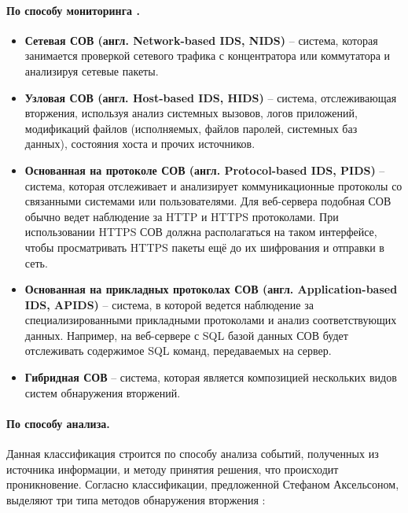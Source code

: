 \paragraph*{По способу мониторинга \cite{kasperskyIDS}.}

\begin{itemize}
	\item \textbf{Сетевая СОВ (англ. Network-based IDS, NIDS)} -- система,
	которая занимается проверкой сетевого трафика с концентратора или коммутатора и
	анализируя сетевые пакеты.

	\item \textbf{Узловая СОВ (англ. Host-based IDS, HIDS)} -- система,
	отслеживающая вторжения, используя анализ системных вызовов, логов приложений,
	модификаций файлов (исполняемых, файлов паролей, системных баз данных), состояния
	хоста и прочих источников.
	
	\item \textbf{Основанная на протоколе СОВ (англ. Protocol-based IDS, PIDS)} -- система, которая отслеживает и анализирует коммуникационные протоколы со связанными системами или пользователями. Для веб-сервера подобная СОВ обычно ведет наблюдение за HTTP и HTTPS протоколами. При использовании HTTPS СОВ должна располагаться на таком интерфейсе, чтобы просматривать HTTPS пакеты ещё до их шифрования и отправки в сеть.

	\item \textbf{Основанная на прикладных протоколах СОВ (англ. Application-based IDS, APIDS)} --
	система, в которой ведется наблюдение за специализированными прикладными протоколами
	и анализ соответствующих данных. Например, на веб-сервере с SQL базой данных СОВ будет
	отслеживать содержимое SQL команд, передаваемых на сервер.

	\item \textbf{Гибридная СОВ} -- система, которая является композицией нескольких видов
	систем обнаружения вторжений.
\end{itemize}


\paragraph*{По способу анализа.}

Данная классификация строится по способу анализа событий, полученных из источника информации, и методу принятия решения, что происходит проникновение. Согласно классификации, предложенной Стефаном Аксельсоном, выделяют три типа методов обнаружения вторжения \cite{IDSClassification}:


